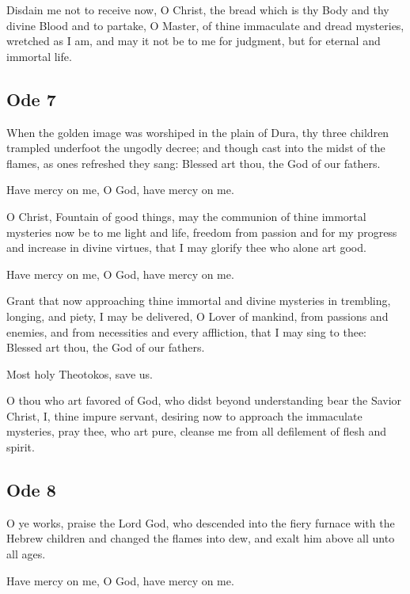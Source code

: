  Disdain me not to receive now, O Christ, the bread which is thy Body and thy divine Blood and to partake, O Master, of thine immaculate and dread mysteries, wretched as I am, and may it not be to me for judgment, but for eternal and immortal life.

\subsection{Ode 7}

 When the golden image was worshiped in the plain of Dura, thy three children trampled underfoot the ungodly decree; and though cast into the midst of the flames, as ones refreshed they sang: Blessed art thou, the God of our fathers.

\hspace{1em} Have mercy on me, O God, have mercy on me.

O Christ, Fountain of good things, may the communion of thine immortal mysteries now be to me light and life, freedom from passion and for my progress and increase in divine virtues, that I may glorify thee who alone art good.

\hspace{1em} Have mercy on me, O God, have mercy on me.

Grant that now approaching thine immortal and divine mysteries in trembling, longing, and piety, I may be delivered, O Lover of mankind, from passions and enemies, and from necessities and every affliction, that I may sing to thee: Blessed art thou, the God of our fathers.

\hspace{1em} Most holy Theotokos, save us.

O thou who art favored of God, who didst beyond understanding bear the Savior Christ, I, thine impure servant, desiring now to approach the immaculate mysteries, pray thee, who art pure, cleanse me from all defilement of flesh and spirit.

\subsection{Ode 8}

 O ye works, praise the Lord God, who descended into the fiery furnace with the Hebrew children and changed the flames into dew, and exalt him above all unto all ages.

\hspace{1em} Have mercy on me, O God, have mercy on me.

